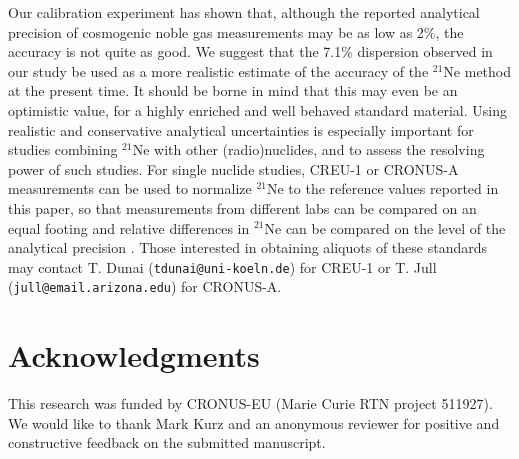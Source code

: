 \documentclass[authoryear,review,12pt]{elsarticle}
\begin{document}
Our calibration experiment has shown that, although the reported
analytical precision of cosmogenic noble gas measurements may be as
low as 2\%, the accuracy is not quite as good. We suggest that the
7.1\% dispersion observed in our study be used as a more realistic
estimate of the accuracy of the $^{21}$Ne method at the present
time. It should be borne in mind that this may even be an optimistic
value, for a highly enriched and well behaved standard material. Using
realistic and conservative analytical uncertainties is especially
important for studies combining $^{21}$Ne with other (radio)nuclides,
and to assess the resolving power of such studies. For single nuclide
studies, CREU-1 or CRONUS-A measurements can be used to normalize
$^{21}$Ne to the reference values reported in this paper, so that
measurements from different labs can be compared on an equal footing
and relative differences in $^{21}$Ne can be compared on the level of
the analytical precision \citep{dunai2009}. Those interested in
obtaining aliquots of these standards may contact T. Dunai
(\verb|tdunai@uni-koeln.de|) for CREU-1 or T. Jull
(\verb|jull@email.arizona.edu|) for CRONUS-A.


\section*{Acknowledgments}

This research was funded by CRONUS-EU (Marie Curie RTN project
511927). We would like to thank Mark Kurz and an anonymous reviewer
for positive and constructive feedback on the submitted manuscript.
\end{document}
